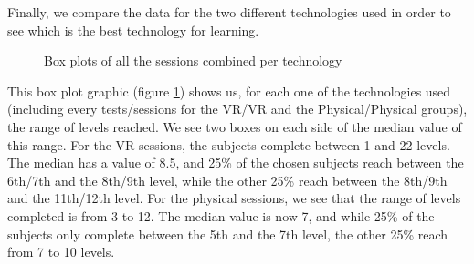 \documentclass[12pt, openany, twocolumn]{article}
\begin{document}
            \noindent Finally, we compare the data for the two different technologies used in order to see which is the best technology for learning. \\

                \begin{figure}[H]
                    \centering
                    \setlength{\fboxsep}{0pt}
                    \caption{Box plots of all the sessions combined per technology}
                    \label{figure17}
                \end{figure}

            This box plot graphic (figure \ref{figure17}) shows us, for each one of the technologies used (including every tests/sessions for the VR/VR and the Physical/Physical groups), the range of levels reached. We see two boxes on each side of the median value of this range.
            For the VR sessions, the subjects complete between 1 and 22 levels. The median has a value of 8.5, and 25\% of the chosen subjects reach between the 6th/7th and the 8th/9th level, while the other 25\% reach between the 8th/9th and the 11th/12th level.
            For the physical sessions, we see that the range of levels completed is from 3 to 12. The median value is now 7, and while 25\% of the subjects only complete between the 5th and the 7th level, the other 25\% reach from 7 to 10 levels.
\end{document}
